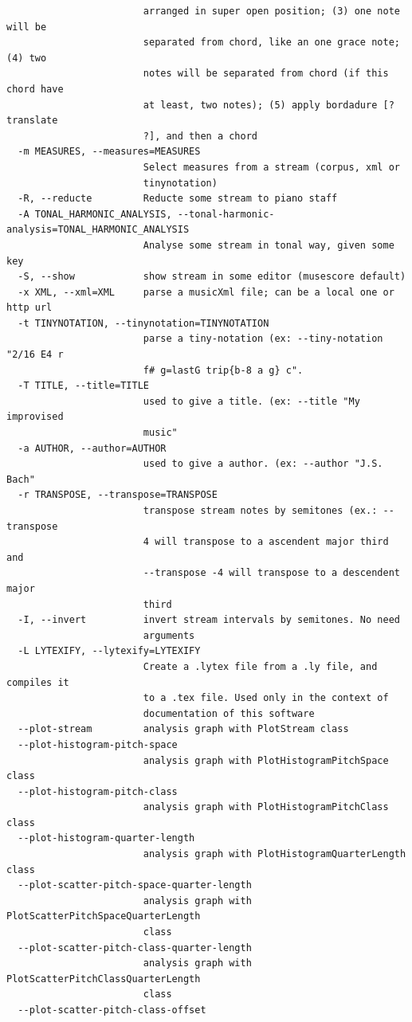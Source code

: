 \begin{verbatim}
                        arranged in super open position; (3) one note will be
                        separated from chord, like an one grace note; (4) two
                        notes will be separated from chord (if this chord have
                        at least, two notes); (5) apply bordadure [? translate
                        ?], and then a chord
  -m MEASURES, --measures=MEASURES
                        Select measures from a stream (corpus, xml or
                        tinynotation)
  -R, --reducte         Reducte some stream to piano staff
  -A TONAL_HARMONIC_ANALYSIS, --tonal-harmonic-analysis=TONAL_HARMONIC_ANALYSIS
                        Analyse some stream in tonal way, given some key
  -S, --show            show stream in some editor (musescore default)
  -x XML, --xml=XML     parse a musicXml file; can be a local one or http url
  -t TINYNOTATION, --tinynotation=TINYNOTATION
                        parse a tiny-notation (ex: --tiny-notation "2/16 E4 r
                        f# g=lastG trip{b-8 a g} c".
  -T TITLE, --title=TITLE
                        used to give a title. (ex: --title "My improvised
                        music"
  -a AUTHOR, --author=AUTHOR
                        used to give a author. (ex: --author "J.S. Bach"
  -r TRANSPOSE, --transpose=TRANSPOSE
                        transpose stream notes by semitones (ex.: --transpose
                        4 will transpose to a ascendent major third and
                        --transpose -4 will transpose to a descendent major
                        third
  -I, --invert          invert stream intervals by semitones. No need
                        arguments
  -L LYTEXIFY, --lytexify=LYTEXIFY
                        Create a .lytex file from a .ly file, and compiles it
                        to a .tex file. Used only in the context of
                        documentation of this software
  --plot-stream         analysis graph with PlotStream class
  --plot-histogram-pitch-space
                        analysis graph with PlotHistogramPitchSpace class
  --plot-histogram-pitch-class
                        analysis graph with PlotHistogramPitchClass class
  --plot-histogram-quarter-length
                        analysis graph with PlotHistogramQuarterLength class
  --plot-scatter-pitch-space-quarter-length
                        analysis graph with PlotScatterPitchSpaceQuarterLength
                        class
  --plot-scatter-pitch-class-quarter-length
                        analysis graph with PlotScatterPitchClassQuarterLength
                        class
  --plot-scatter-pitch-class-offset

\end{verbatim}
